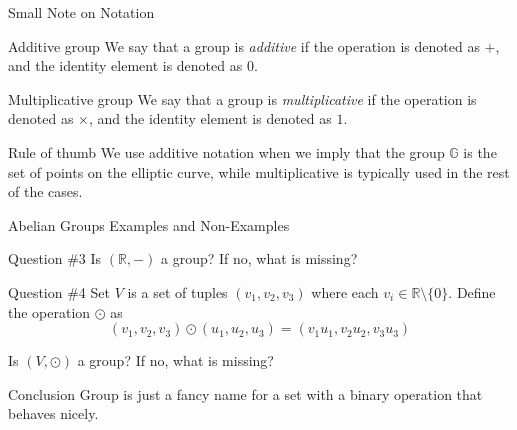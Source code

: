 \documentclass{beamer}
\begin{document}
    \begin{frame}{Small Note on Notation}
      \begin{block}{Additive group}
          We say that a group is \textit{additive} if the operation is denoted as $+$, and the identity element is denoted as $0$.\pause
      \end{block}

      \begin{block}{Multiplicative group}
          We say that a group is \textit{multiplicative} if the operation is denoted as $\times$, and the identity element is denoted as $1$.\pause
      \end{block}
      \begin{block}{Rule of thumb}
        We use additive notation when we imply that the group $\mathbb{G}$ is the set of points on the elliptic curve, while multiplicative is typically used in the rest of the cases.
      \end{block}
  \end{frame}

    \begin{frame}{Abelian Groups Examples and Non-Examples}
      \begin{alertblock}{Question \#3}
        Is $(\mathbb{R}, -)$ a group? If no, what is missing? \pause
      \end{alertblock}
      \begin{alertblock}{Question \#4}
          Set $V$ is a set of tuples $(v_1,v_2,v_3)$ where each $v_i \in \mathbb{R} \setminus \{0\}$. Define the operation $\odot$ as
          \begin{equation*}
              (v_1,v_2,v_3) \odot (u_1,u_2,u_3) = (v_1u_1, v_2u_2, v_3u_3)
          \end{equation*}

          Is $(V, \odot)$ a group? If no, what is missing?\pause
      \end{alertblock}
      \begin{block}{Conclusion}
        Group is just a fancy name for a set with a binary operation that behaves nicely.
      \end{block}
    \end{frame}
\end{document}
